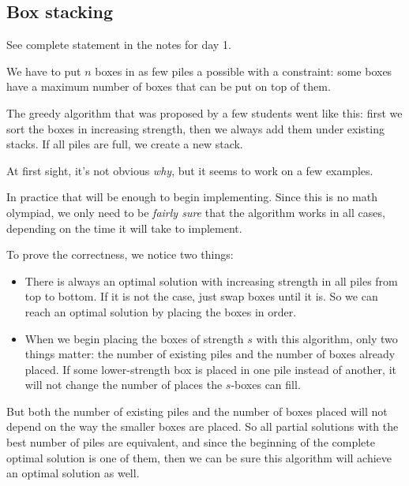 \subsection{Box stacking}

See complete statement in the notes for day 1.

We have to put $n$ boxes in as few piles a possible with a constraint:
some boxes have a maximum number of boxes that can be put on top of them.

The greedy algorithm that was proposed by a few students went like this:
first we sort the boxes in increasing strength, then we always add them
under existing stacks. If all piles are full, we create a new stack.

At first sight, it's not obvious \emph{why}, but it seems to work on a
few examples.

In practice that will be enough to begin implementing.
Since this is no math olympiad, we only need to be \emph{fairly sure}
that the algorithm works in all cases, depending on the time it will take
to implement.

To prove the correctness, we notice two things:
\begin{itemize}
    \item There is always an optimal solution with increasing strength
        in all piles from top to bottom.
        If it is not the case, just swap boxes until it is.
        So we can reach an optimal solution by placing the boxes in order.
    \item When we begin placing the boxes of strength $s$ with this algorithm,
        only two things matter: the number of existing piles and the number
        of boxes already placed.
        If some lower-strength box is placed in
        one pile instead of another, it will not change the number of places
        the $s$-boxes can fill.
\end{itemize}
But both the number of existing piles and the number of boxes placed
will not depend on the way the smaller boxes are placed.
So all partial solutions with the best number of piles are equivalent,
and since the beginning of the complete optimal solution is one of them,
then we can be sure this algorithm will achieve an optimal solution as well.
